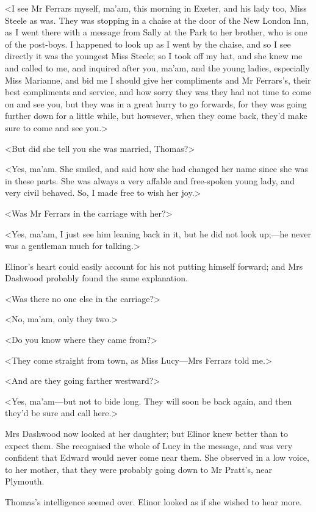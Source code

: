 <I see Mr Ferrars myself, ma'am, this morning in Exeter, and his lady too, Miss Steele as was. They was stopping in a chaise at the door of the New London Inn, as I went there with a message from Sally at the Park to her brother, who is one of the post-boys. I happened to look up as I went by the chaise, and so I see directly it was the youngest Miss Steele; so I took off my hat, and she knew me and called to me, and inquired after you, ma'am, and the young ladies, especially Miss Marianne, and bid me I should give her compliments and Mr Ferrars's, their best compliments and service, and how sorry they was they had not time to come on and see you, but they was in a great hurry to go forwards, for they was going further down for a little while, but howsever, when they come back, they'd make sure to come and see you.>

<But did she tell you she was married, Thomas?>

<Yes, ma'am. She smiled, and said how she had changed her name since she was in these parts. She was always a very affable and free-spoken young lady, and very civil behaved. So, I made free to wish her joy.>

<Was Mr Ferrars in the carriage with her?>

<Yes, ma'am, I just see him leaning back in it, but he did not look up;—he never was a gentleman much for talking.>

Elinor's heart could easily account for his not putting himself forward; and Mrs Dashwood probably found the same explanation.

<Was there no one else in the carriage?>

<No, ma'am, only they two.>

<Do you know where they came from?>

<They come straight from town, as Miss Lucy—Mrs Ferrars told me.>

<And are they going farther westward?>

<Yes, ma'am—but not to bide long. They will soon be back again, and then they'd be sure and call here.>

Mrs Dashwood now looked at her daughter; but Elinor knew better than to expect them. She recognised the whole of Lucy in the message, and was very confident that Edward would never come near them. She observed in a low voice, to her mother, that they were probably going down to Mr Pratt's, near Plymouth.

Thomas's intelligence seemed over. Elinor looked as if she wished to hear more.

